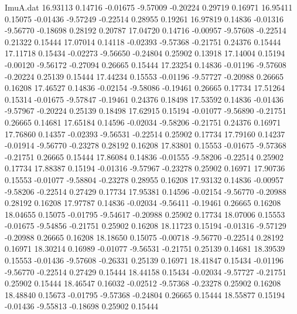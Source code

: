 \begin{filecontents}{ImuA.dat}
  16.93113    0.14716   -0.01675   -9.57009   -0.20224    0.29719    0.16971
  16.95411    0.15075   -0.01436   -9.57249   -0.22514    0.28955    0.19261
  16.97819    0.14836   -0.01316   -9.56770   -0.18698    0.28192    0.20787
  17.04720    0.14716   -0.00957   -9.57608   -0.22514    0.21322    0.15444
  17.07014    0.14118   -0.02393   -9.57368   -0.21751    0.24376    0.15444
  17.11718    0.15434   -0.02273   -9.56650   -0.24804    0.25902    0.13918
  17.14004    0.15194   -0.00120   -9.56172   -0.27094    0.26665    0.15444
  17.23254    0.14836   -0.01196   -9.57608   -0.20224    0.25139    0.15444
  17.44234    0.15553   -0.01196   -9.57727   -0.20988    0.26665    0.16208
  17.46527    0.14836   -0.02154   -9.58086   -0.19461    0.26665    0.17734
  17.51264    0.15314   -0.01675   -9.57847   -0.19461    0.24376    0.18498
  17.53592    0.14836   -0.01436   -9.57967   -0.20224    0.25139    0.18498
  17.62915    0.15194   -0.01077   -9.56890   -0.21751    0.26665    0.14681
  17.65184    0.14596   -0.02034   -9.58206   -0.21751    0.24376    0.16971
  17.76860    0.14357   -0.02393   -9.56531   -0.22514    0.25902    0.17734
  17.79160    0.14237   -0.01914   -9.56770   -0.23278    0.28192    0.16208
  17.83801    0.15553   -0.01675   -9.57368   -0.21751    0.26665    0.15444
  17.86084    0.14836   -0.01555   -9.58206   -0.22514    0.25902    0.17734
  17.88387    0.15194   -0.01316   -9.57967   -0.23278    0.25902    0.16971
  17.90736    0.15553   -0.01077   -9.58804   -0.23278    0.28955    0.16208
  17.93132    0.14836   -0.00957   -9.58206   -0.22514    0.27429    0.17734
  17.95381    0.14596   -0.02154   -9.56770   -0.20988    0.28192    0.16208
  17.97787    0.14836   -0.02034   -9.56411   -0.19461    0.26665    0.16208
  18.04655    0.15075   -0.01795   -9.54617   -0.20988    0.25902    0.17734
  18.07006    0.15553   -0.01675   -9.54856   -0.21751    0.25902    0.16208
  18.11723    0.15194   -0.01316   -9.57129   -0.20988    0.26665    0.16208
  18.18650    0.15075   -0.00718   -9.56770   -0.22514    0.28192    0.16971
  18.30214    0.16989   -0.01077   -9.56531   -0.21751    0.25139    0.14681
  18.39539    0.15553   -0.01436   -9.57608   -0.26331    0.25139    0.16971
  18.41847    0.15434   -0.01196   -9.56770   -0.22514    0.27429    0.15444
  18.44158    0.15434   -0.02034   -9.57727   -0.21751    0.25902    0.15444
  18.46547    0.16032   -0.02512   -9.57368   -0.23278    0.25902    0.16208
  18.48840    0.15673   -0.01795   -9.57368   -0.24804    0.26665    0.15444
  18.55877    0.15194   -0.01436   -9.55813   -0.18698    0.25902    0.15444

\end{filecontents}
